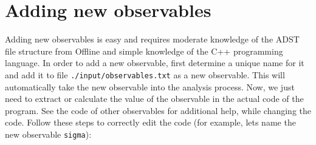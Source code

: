 \documentclass[12pt,a4paper]{report}
\begin{document}
\section{Adding new observables} \label{ch:add-obs}
Adding new observables is easy and requires moderate knowledge of the ADST file structure from Offline and simple knowledge of the C++ programming language. In order to add a new observable, first determine a unique name for it and add it to file \texttt{./input/observables.txt} as a new observable. This will automatically take the new observable into the analysis process. Now, we just need to extract or calculate the value of the observable in the actual code of the program. See the code of other observables for additional help, while changing the code. Follow these steps to correctly edit the code (for example, lets name the new observable \texttt{sigma}):
\end{document}
